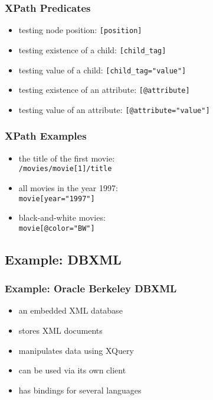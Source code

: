 \documentclass[dvipsnames]{beamer}
\theoremstyle{plain}
\begin{document}
\begin{frame}
  \frametitle{XPath Predicates}

  \begin{itemize}
    \item testing node position: \lstinline![position]!

    \pause
    \medskip
    \item testing existence of a child: \lstinline![child_tag]!
    \item testing value of a child: \lstinline![child_tag="value"]!

    \pause
    \medskip
    \item testing existence of an attribute: \lstinline![@attribute]!
    \item testing value of an attribute: \lstinline![@attribute="value"]!
  \end{itemize}
\end{frame}

\begin{frame}
  \frametitle{XPath Examples}

  \begin{example}
    \begin{itemize}
      \item the title of the first movie:\\
        \lstinline!/movies/movie[1]/title!

      \pause
      \item all movies in the year 1997:\\
        \lstinline!movie[year="1997"]!

      \pause
      \item black-and-white movies:\\
        \lstinline!movie[@color="BW"]!
    \end{itemize}
  \end{example}
\end{frame}

\subsection{Example: DBXML}

\begin{frame}
  \frametitle{Example: Oracle Berkeley DBXML}

  \begin{itemize}
    \item an embedded XML database
    \item stores XML documents
    \item manipulates data using XQuery
    \item can be used via its own client
    \item has bindings for several languages
  \end{itemize}
\end{frame}
\end{document}
